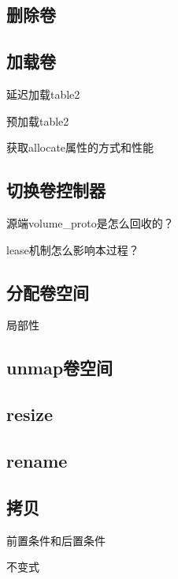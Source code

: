 \subsection{删除卷}

\subsection{加载卷}

\begin{compactenum}
\item 延迟加载table2
\item 预加载table2
\item 获取allocate属性的方式和性能
\end{compactenum}

\subsection{切换卷控制器}

\begin{compactenum}
\item 源端volume\_proto是怎么回收的？
\item lease机制怎么影响本过程？
\end{compactenum}

\subsection{分配卷空间}

局部性

\subsection{unmap卷空间}

\subsection{resize}

\subsection{rename}

\subsection{拷贝}

前置条件和后置条件

不变式

